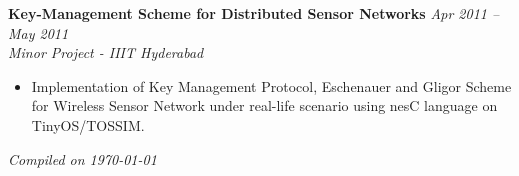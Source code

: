\documentclass[margin,line]{resume}
\begin{document}
\begin{resume}
    \textbf{Key-Management Scheme for Distributed Sensor Networks} \hfill \textsl{Apr 2011 -- May 2011}\vspace{0mm}\\\vspace{0mm}%
    \textsl{Minor Project - IIIT Hyderabad} 
       \begin{itemize} 
            \item Implementation of Key Management Protocol, Eschenauer and Gligor Scheme for Wireless Sensor Network under real-life scenario using nesC language on TinyOS/TOSSIM.
       \end{itemize}

\hfill \textsl{Compiled on \monthyeardate\today}

\end{resume}
\end{document}
